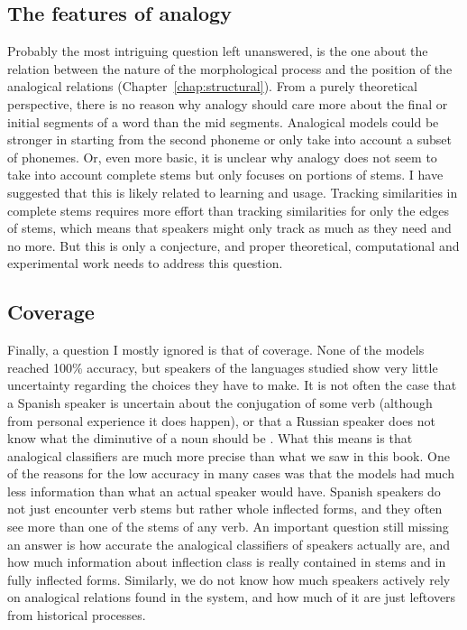 \subsection{The features of analogy}

Probably the most intriguing question left unanswered, is the one about the relation between the nature of the morphological process and the position of the analogical relations (Chapter~\ref{chap:structural}).
From a purely theoretical perspective, there is no reason why analogy should care more about the final or initial segments of a word than the mid segments.
Analogical models could be stronger in starting from the second phoneme or only take into account a subset of phonemes.
Or, even more basic, it is unclear why analogy does not seem to take into account complete stems but only focuses on portions of stems.
I have suggested that this is likely related to learning and usage.
Tracking similarities in complete stems requires more effort than tracking similarities for only the edges of stems, which means that speakers might only track as much as they need and no more.
But this is only a conjecture, and proper theoretical, computational and experimental work needs to address this question.

\subsection{Coverage}

Finally, a question I mostly ignored is that of coverage.
None of the models reached 100\% accuracy, but speakers of the languages studied show very little uncertainty regarding the choices they have to make.
It is not often the case that a Spanish speaker is uncertain about the conjugation of some verb (although from personal experience it does happen), or that a Russian speaker does not know what the diminutive of a noun should be \autocite{Gouskova.2015}.
What this means is that analogical classifiers are much more precise than what we saw in this book.
One of the reasons for the low accuracy in many cases was that the models had much less information than what an actual speaker would have.
Spanish speakers do not just encounter verb stems but rather whole inflected forms, and they often see more than one of the stems of any verb.
An important question still missing an answer is how accurate the analogical classifiers of speakers actually are, and how much information about inflection class is really contained in stems and in fully inflected forms.
Similarly, we do not know how much speakers actively rely on analogical relations found in the system, and how much of it are just leftovers from historical processes.

